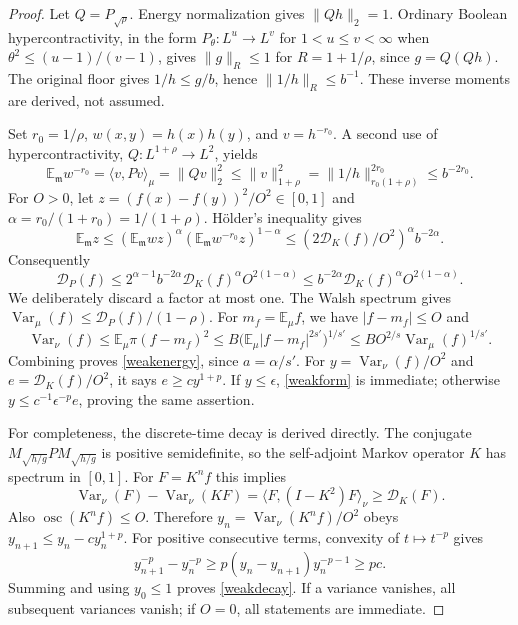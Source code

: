 \documentclass[11pt]{article}
\newcommand{\E}{\mathbb E}
\begin{document}
\begin{proof}
Let $Q=P_{\sqrt\rho}$. Energy normalization gives $\|Qh\|_2=1$.
Ordinary Boolean hypercontractivity, in the form
$P_\theta:L^u\to L^v$ for $1<u\leq v<\infty$ when $\theta^2\leq(u-1)/(v-1)$,
gives $\|g\|_R\leq1$ for $R=1+1/\rho$, since $g=Q(Qh)$.
The original floor gives $1/h\leq g/b$, hence
$\|1/h\|_R\leq b^{-1}$. These inverse moments are derived, not assumed.

Set $r_0=1/\rho$, $w(x,y)=h(x)h(y)$, and $v=h^{-r_0}$.
A second use of hypercontractivity, $Q:L^{1+\rho}\to L^2$, yields
\[
 \E_{\mathfrak m}w^{-r_0}
 =\langle v,Pv\rangle_\mu=\|Qv\|_2^2
 \leq\|v\|_{1+\rho}^2
 =\|1/h\|_{r_0(1+\rho)}^{2r_0}
 \leq b^{-2r_0}.
\]
For $O>0$, let $z=(f(x)-f(y))^2/O^2\in[0,1]$ and
$\alpha=r_0/(1+r_0)=1/(1+\rho)$. H\"older's inequality gives
\[
 \E_{\mathfrak m}z
 \leq(\E_{\mathfrak m}wz)^\alpha
       (\E_{\mathfrak m}w^{-r_0}z)^{1-\alpha}
 \leq(2\mathcal D_K(f)/O^2)^\alpha b^{-2\alpha}.
\]
Consequently
\[
 \mathcal D_P(f)
 \leq 2^{\alpha-1}b^{-2\alpha}
         \mathcal D_K(f)^\alpha O^{2(1-\alpha)}
 \leq b^{-2\alpha}\mathcal D_K(f)^\alpha O^{2(1-\alpha)}.
\]
We deliberately discard a factor at most one. The Walsh spectrum gives
$\operatorname{Var}_\mu(f)\leq\mathcal D_P(f)/(1-\rho)$.
For $m_f=\E_\mu f$, we have $|f-m_f|\leq O$ and
\[
 \operatorname{Var}_\nu(f)
 \leq\E_\mu\pi(f-m_f)^2
 \leq B\bigl(\E_\mu|f-m_f|^{2s'}\bigr)^{1/s'}
 \leq B O^{2/s}\operatorname{Var}_\mu(f)^{1/s'}.
\]
Combining proves \eqref{weakenergy}, since $a=\alpha/s'$.
For $y=\operatorname{Var}_\nu(f)/O^2$ and
$e=\mathcal D_K(f)/O^2$, it says $e\geq c y^{1+p}$.
If $y\leq\epsilon$, \eqref{weakform} is immediate; otherwise
$y\leq c^{-1}\epsilon^{-p}e$, proving the same assertion.

For completeness, the discrete-time decay is derived directly.
The conjugate $M_{\sqrt{h/g}}P M_{\sqrt{h/g}}$ is positive semidefinite,
so the self-adjoint Markov operator $K$ has spectrum in $[0,1]$.
For $F=K^n f$ this implies
\[
 \operatorname{Var}_\nu(F)-\operatorname{Var}_\nu(KF)
 =\langle F,(I-K^2)F\rangle_\nu\geq\mathcal D_K(F).
\]
Also $\operatorname{osc}(K^n f)\leq O$. Therefore
$y_n=\operatorname{Var}_\nu(K^n f)/O^2$ obeys
$y_{n+1}\leq y_n-cy_n^{1+p}$.
For positive consecutive terms, convexity of $t\mapsto t^{-p}$ gives
\[
 y_{n+1}^{-p}-y_n^{-p}
 \geq p(y_n-y_{n+1})y_n^{-p-1}\geq pc.
\]
Summing and using $y_0\leq1$ proves \eqref{weakdecay}.
If a variance vanishes, all subsequent variances vanish; if $O=0$,
all statements are immediate.
\end{proof}
\end{document}
